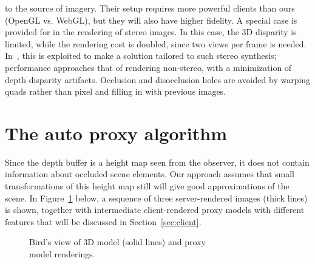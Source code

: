 \documentclass[10pt,conference,compsocconf]{IEEEtran}
\newcommand{\etal}{{et~al.}}
\begin{document}
to the source of imagery. Their setup requires more powerful clients than ours
(OpenGL vs. WebGL), but they will also have higher fidelity.
%
A special case is provided for in the rendering of stereo images. In this case,
the 3D disparity is limited, while the rendering cost is doubled, since two
views per frame is needed. In~\cite{DidykERMS2010}, this is exploited to make a
solution tailored to such stereo synthesis; performance approaches that of
rendering non-stereo, with a minimization of depth disparity
artifacts. Occlusion and disocclusion holes are avoided by warping quads rather
than pixel and filling in with previous images.
%







\section{The auto proxy algorithm}
\label{sec:autoproxy}

Since the depth buffer is a height map seen from the observer, it
does not contain information about occluded scene elements. Our approach assumes
that small transformations of this height map still will give good
approximations of the scene. In Figure~\ref{fig:2DheightmapRotated} below, a
sequence of three server-rendered images (thick lines) is shown, together with
intermediate client-rendered proxy models with different features that will be
discussed in Section~\ref{sec:client}.

\begin{figure}[htb]
  \centering
  \caption{\label{fig:2DheightmapRotated}
Bird's view of 3D model (solid lines) and proxy\\model renderings.
}
\end{figure}

\end{document}
